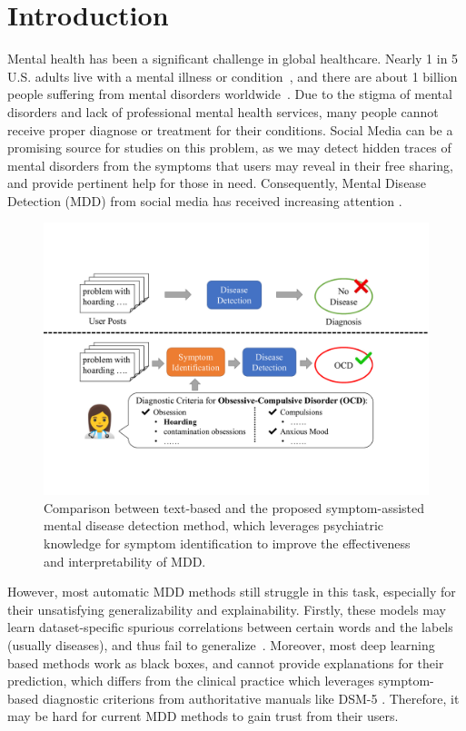 \section{Introduction}

Mental health has been a significant challenge in global healthcare. Nearly 1 in 5 U.S. adults live 
with a mental illness or condition~\citep{NIMHMental}, and there are about 1 billion people suffering from mental disorders worldwide~\citep{UNMental}. Due to the stigma of mental disorders and lack of professional mental health services, many people cannot receive proper diagnose or treatment for their conditions. Social Media can be a promising source for studies on this problem, as we may detect hidden traces of mental disorders from the symptoms that users may reveal in their free sharing, and provide pertinent help for those in need. Consequently, Mental Disease Detection (MDD) from social media has received increasing attention \citep{coppersmith2015adhd,cohan2018smhd}. 

\begin{figure}[t]
    \centering
    \includegraphics[width=1.0\columnwidth]{figures/overview.pdf}
    \caption{Comparison between text-based and the proposed symptom-assisted 
mental disease detection method, which leverages psychiatric knowledge for 
symptom identification to improve the effectiveness and interpretability of MDD.}
    \label{fig:overview}
\end{figure}

However, most automatic MDD methods still struggle in this task, especially for their unsatisfying generalizability and explainability. Firstly, these models may learn dataset-specific spurious correlations between certain words and the labels (usually diseases), and thus fail to generalize~\citep{harrigian2020models}. Moreover, most deep learning based methods work as black boxes, and cannot provide explanations for their prediction, which differs from the clinical practice which leverages symptom-based diagnostic criterions from authoritative manuals like DSM-5 \citep{american2013diagnostic}. Therefore, it may be hard for current MDD methods to gain trust from their users. 

